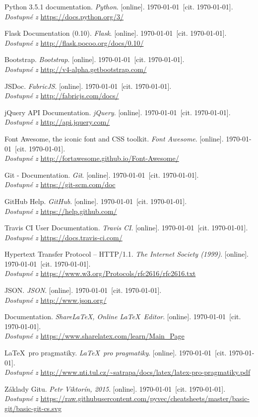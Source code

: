 \renewcommand{\refname}{Seznam použitých zdrojů}

\newcommand{\wwwbibitem}[3]{%
	#1. \textit{#2}. [online]. \bibciteformat\today\ [cit. \today].\\
	\emph{Dostupné z} \href{#3}{#3}%
}

\begin{thebibliography}{00}
	\wwwbibitem{Python 3.5.1 documentation}{Python}{https://docs.python.org/3/}

	\wwwbibitem{Flask Documentation (0.10)}{Flask}{http://flask.pocoo.org/docs/0.10/}

	\wwwbibitem{Bootstrap}{Bootstrap}{http://v4-alpha.getbootstrap.com/}

	\wwwbibitem{JSDoc}{FabricJS}{http://fabricjs.com/docs/}

	\wwwbibitem{jQuery API Documentation}{jQuery}{http://api.jquery.com/}

	\wwwbibitem{Font Awesome, the iconic font and CSS toolkit}{Font Awesome}{http://fortawesome.github.io/Font-Awesome/}

	\wwwbibitem{Git - Documentation}{Git}{https://git-scm.com/doc}

	\wwwbibitem{GitHub Help}{GitHub}{https://help.github.com/}

	\wwwbibitem{Travis CI User Documentation}{Travis CI}{https://docs.travis-ci.com/}

	\wwwbibitem{Hypertext Transfer Protocol -- HTTP/1.1}{The Internet Society (1999)}{https://www.w3.org/Protocols/rfc2616/rfc2616.txt}

	\wwwbibitem{JSON}{JSON}{http://www.json.org/}

	\wwwbibitem{Documentation}{Share\LaTeX, Online \LaTeX\ Editor}{https://www.sharelatex.com/learn/Main\_Page}

	\wwwbibitem{\LaTeX\ pro pragmatiky}{\LaTeX\ pro pragmatiky}{http://www.nti.tul.cz/\textasciitilde{}satrapa/docs/latex/latex-pro-pragmatiky.pdf}

	\wwwbibitem{Základy Gitu}{Petr Viktorín, 2015}{https://raw.githubusercontent.com/pyvec/cheatsheets/master/basic-git/basic-git-cs.svg}
\end{thebibliography}
